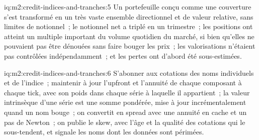\begin{solution}{iq:m2:credit-indices-and-tranches:5}
Un portefeuille conçu comme une couverture s'est transformé en un très vaste ensemble directionnel
et de valeur relative, sans limites de notionnel~; le notionnel net a triplé en un trimestre~; les
positions ont atteint un multiple important du volume quotidien du marché, si bien qu'elles ne pouvaient
pas être dénouées sans faire bouger les prix~; les valorisations n'étaient pas contrôlées indépendamment~; et les
pertes ont d'abord été sous-estimées.
\end{solution}

\begin{solution}{iq:m2:credit-indices-and-tranches:6}
S'abonner aux cotations des noms individuels et de l'indice~; maintenir à jour l'upfront et
l'annuité de chaque composant à chaque tick, avec son poids dans chaque série à laquelle il appartient~; la
valeur intrinsèque d'une série est une somme pondérée, mise à jour incrémentalement quand un
nom bouge~; on convertit en spread avec une annuité en cache et un pas de Newton~; on publie le
skew, avec l'âge et la qualité des cotations qui le sous-tendent, et signale les noms dont les données sont périmées.
\end{solution}
